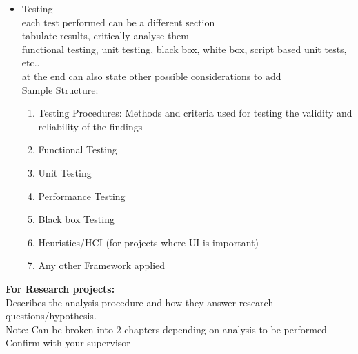 \begin{itemize}
    \item Testing \\
each test performed can be a different section \\
tabulate results, critically analyse them \\
functional testing, unit testing, black box, white box, script based unit tests, etc.. \\
at the end can also state other possible considerations to add \\
Sample Structure:
\begin{enumerate}[label=(\alph*)]
    \item Testing Procedures: Methods and criteria used for testing the validity and reliability of the findings
    \item Functional Testing
    \item Unit Testing
    \item Performance Testing
    \item Black box Testing
    \item Heuristics/HCI (for projects where UI is important)
    \item Any other Framework applied
\end{enumerate}

\end{itemize}

\vspace{2em}

\textbf{For Research projects:}\\
Describes the analysis procedure and how they answer research questions/hypothesis.\\
Note: Can be broken into 2 chapters depending on analysis to be performed – Confirm with your supervisor

